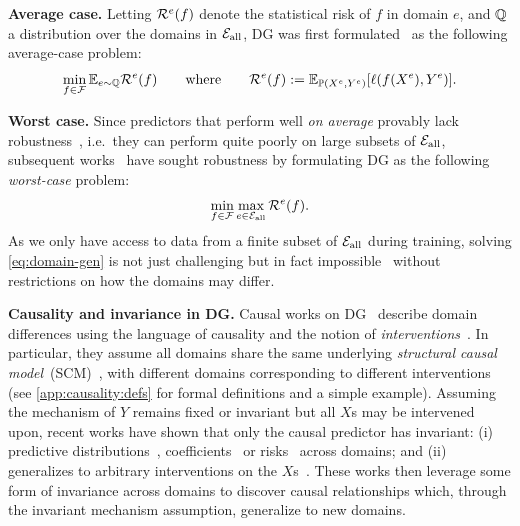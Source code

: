 \documentclass{article}
\begin{document}
\textbf{Average case.} Letting $\mathcal{R}^e(f)$ denote the statistical risk of $f$ in domain $e$, and $\mathbb{Q}$ a distribution over the domains in ${\mathcal{E}_\text{all}}$, DG was first formulated~\citep{blanchard2011generalizing, muandet2013domain} as the following average-case problem:
\begin{equation}\label{eq:domain-gen-average-case}
    \min_{f\in\mathcal{F}} \mathbb{E}_{e \sim \mathbb{Q}} \mathcal{R}^e(f)
    \qquad \text{where} \qquad 
    \mathcal{R}^e(f) := \mathbb{E}_{\mathbb{P}(X^e, Y^e)} [\ell(f(X^e), Y^e)].
\end{equation}

\textbf{Worst case.}  Since predictors that perform well \emph{on average} provably lack robustness~\citep{nagarajan2021understanding}, i.e.\ they can perform quite poorly on large subsets of ${\mathcal{E}_\text{all}}$, subsequent works~\citep{ben2009robust, sagawa2019distributionally, arjovsky2020invariant, krueger21rex, ahuja2021invariance, robey2021modelbased} have sought robustness by formulating DG as the following \emph{worst-case} problem:
\begin{equation}
\label{eq:domain-gen}
    \min_{f\in\mathcal{F}} \max_{e \in {\mathcal{E}_\text{all}}} \mathcal{R}^e(f).
\end{equation}
%
As we only have access to data from a finite subset of ${\mathcal{E}_\text{all}}$ during training, solving \eqref{eq:domain-gen} is not just challenging but in fact impossible~\citep{krueger21rex,ben2010theory,christiansen2021causal} without restrictions on how the domains may differ. %
%
%
%
%

%
%
%
%
%
%
%
%
%
%
%
%

%
%



%
\textbf{Causality and invariance in DG.} Causal works on DG~\citep{arjovsky2020invariant, krueger21rex, peters2016causal, christiansen2021causal, rojas2018invariant} describe domain differences using the language of causality and the notion of \textit{interventions}~\cite{pearl2009causality, peters2017elements}. In particular, they assume
%
all domains share the same underlying \textit{structural causal model}~(SCM)~\cite{pearl2009causality}, with different domains corresponding to different interventions (see \cref{app:causality:defs} for formal definitions and a simple example).
%
%
%
%
%
Assuming the mechanism of $Y$ remains fixed or invariant
%
but all $X$s may be intervened upon, recent works have shown that only the causal predictor has invariant: (i) predictive distributions~\citep{peters2016causal}, coefficients~\citep{arjovsky2020invariant} or risks~\citep{krueger21rex} across domains; and (ii) generalizes to arbitrary interventions on the $X$s~\citep{peters2016causal, arjovsky2020invariant,rojas2018invariant}.  These works then
%
leverage some form of invariance across domains to discover causal relationships which, through the invariant mechanism assumption, generalize to new domains.
\end{document}
